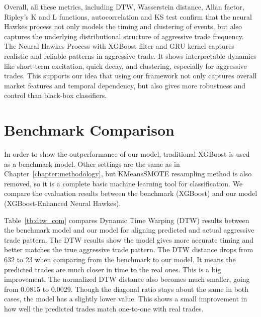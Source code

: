 Overall, all these metrics, including DTW, Wasserstein distance, Allan factor, Ripley's K and L functions, autocorrelation and KS test confirm that the neural Hawkes process not only models the timing and clustering of events, but also captures the underlying distributional structure of aggressive trade frequency. The Neural Hawkes Process with XGBoost filter and GRU kernel captures realistic and reliable patterns in aggressive trade. It shows interpretable dynamics like short-term excitation, quick decay, and clustering, especially for aggressive trades. This supports our idea that using our framework not only captures overall market features and temporal dependency, but also gives more robustness and control than black-box classifiers.


\newpage

\section{Benchmark Comparison} \label{sec:benchmark}
In order to show the outperformance of our model, traditional XGBoost is used as a benchmark model. Other settings are the same as in Chapter~\ref{chapter:methodology}, but KMeansSMOTE resampling method is also removed, so it is a complete basic machine learning tool for classification. We compare the evaluation results between the benchmark (XGBoost) and our model (XGBoost-Enhanced Neural Hawkes). 

Table~\ref{tb:dtw_com} compares Dynamic Time Warping (DTW) results between the benchmark model and our model for aligning predicted and actual aggressive trade pattern. The DTW results show the model gives more accurate timing and better matches the true aggressive trade pattern. The DTW distance drops from 632 to 23 when comparing from the benchmark to our model. It means the predicted trades are much closer in time to the real ones. This is a big improvement. The normalized DTW distance also becomes much smaller, going from 0.0815 to 0.0029. Though the diagonal ratio stays about the same in both cases, the model has a slightly lower value. This shows a small improvement in how well the predicted trades match one-to-one with real trades.

